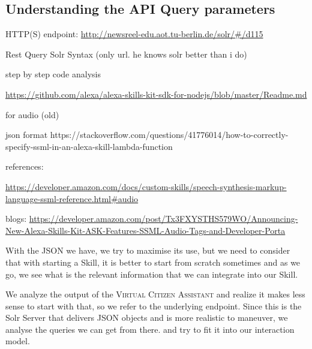 



\subsection*{Understanding the API Query parameters}
HTTP(S) endpoint:
\url{http://newsreel-edu.aot.tu-berlin.de/solr/#/d115}

Rest Query
Solr Syntax (only url. he knows solr better than i do)








step by step code analysis

\url{https://github.com/alexa/alexa-skills-kit-sdk-for-nodejs/blob/master/Readme.md}





for audio (old)

json format https://stackoverflow.com/questions/41776014/how-to-correctly-specify-ssml-in-an-alexa-skill-lambda-function





references:

\url{https://developer.amazon.com/docs/custom-skills/speech-synthesis-markup-language-ssml-reference.html#audio}



blogs:
\url{https://developer.amazon.com/post/Tx3FXYSTHS579WO/Announcing-New-Alexa-Skills-Kit-ASK-Features-SSML-Audio-Tags-and-Developer-Porta}

With the JSON we have, we try to maximise its use, but we need to consider that with starting a Skill, it is better to start from scratch sometimes and as we go, we see what is the relevant information that we can integrate into our Skill.

We analyze the output of the \textsc{Virtual Citizen Assistant } and realize it makes less sense to start with that, so we refer to the underlying endpoint. Since this is the Solr Server that delivers JSON objects and is more realistic to maneuver, we analyse the queries we can get from there. and try to fit it into our interaction model.

